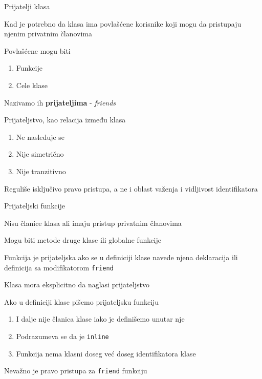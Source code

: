 \documentclass{article}
\newenvironment{xitemize}{%
    
    \itemize
    \larger
}{%
    \enditemize
}
\let\olditemize\itemize
\let\endolditemize\enditemize
\renewenvironment{itemize}{%
    \smaller
    \olditemize
}{%
    \endolditemize
}
\providecommand{\inlinecode}[1]{\texttt{#1}}
\begin{document}
\begin{xitemize}
\begin{itemize}
\end{itemize}
\item Prijatelji klasa
\begin{itemize}
    \item Kad je potrebno da klasa ima povlašćene korisnike koji mogu da pristupaju njenim privatnim članovima
    \item Povlašćene mogu biti
    \begin{enumerate}
        \item Funkcije
        \item Cele klase
    \end{enumerate}
    \item Nazivamo ih \textbf{prijateljima} - \textit{friends}
    \item Prijateljstvo, kao relacija između klasa
    \begin{enumerate}
        \item Ne nasleđuje se
        \item Nije simetrično \frownie
        \item Nije tranzitivno
    \end{enumerate}
    \item Reguliše isključivo pravo pristupa, a ne i oblast važenja i vidljivost identifikatora
\end{itemize}
\item Prijateljski funkcije
\begin{itemize}
    \item Nisu članice klasa ali imaju pristup privatnim članovima
    \item Mogu biti metode druge klase ili globalne funkcije
    \item Funkcija je prijateljska ako se u definiciji klase navede njena deklaracija ili definicija sa modifikatorom \inlinecode{friend}
    \item Klasa mora eksplicitno da naglasi prijateljstvo
    \item Ako u definiciji klase pišemo prijateljsku funkciju
    \begin{enumerate}
        \item I dalje nije članica klase iako je definišemo unutar nje
        \item Podrazumeva se da je \inlinecode{inline}
        \item Funkcija nema klasni doseg već doseg identifikatora klase
    \end{enumerate}
    \item Nevažno je pravo pristupa za \inlinecode{friend} funkciju

\end{itemize}
\end{xitemize}
\end{document}
